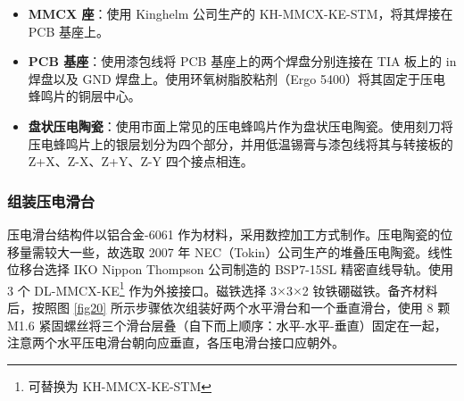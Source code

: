 \documentclass[zihao=-4]{ctexart}
\begin{document}
\begin{spacing}{1.5}
\begin{itemize}
				\item \textbf{MMCX 座}：使用 Kinghelm 公司生产的 KH-MMCX-KE-STM，将其焊接在 PCB 基座上。
				
				\item \textbf{PCB 基座}：使用漆包线将 PCB 基座上的两个焊盘分别连接在 TIA 板上的 in 焊盘以及 GND 焊盘上。使用环氧树脂胶粘剂（Ergo 5400）将其固定于压电蜂鸣片的铜层中心。
				
				\item \textbf{盘状压电陶瓷}：使用市面上常见的压电蜂鸣片作为盘状压电陶瓷。使用刻刀将压电蜂鸣片上的银层划分为四个部分，并用低温锡膏与漆包线将其与转接板的 Z+X、Z-X、Z+Y、Z-Y 四个接点相连。
				
			\end{itemize}
			
			
			
		
			
			
			
		\subsubsection{组装压电滑台}
			压电滑台结构件以铝合金-6061 作为材料，采用数控加工方式制作。压电陶瓷的位移量需较大一些，故选取 2007 年 NEC（Tokin）公司生产的堆叠压电陶瓷。线性位移台选择 IKO Nippon Thompson 公司制造的 BSP7-15SL 精密直线导轨。使用 3 个 DL-MMCX-KE\footnote{可替换为 KH-MMCX-KE-STM} 作为外接接口。磁铁选择 3$\times$3$\times$2 钕铁硼磁铁。备齐材料后，按照图 \ref{fig20} 所示步骤依次组装好两个水平滑台和一个垂直滑台，使用 8 颗 M1.6 紧固螺丝将三个滑台层叠（自下而上顺序：水平-水平-垂直）固定在一起，注意两个水平压电滑台朝向应垂直，各压电滑台接口应朝外。
			

\end{spacing}
\end{document}
